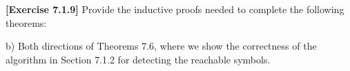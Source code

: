 \textbf{[Exercise 7.1.9]} Provide the inductive proofs needed to complete
the following theorems:

b) Both directions of Theorems 7.6, where we show the correctness
of the algorithm in Section 7.1.2 for detecting the reachable symbols.